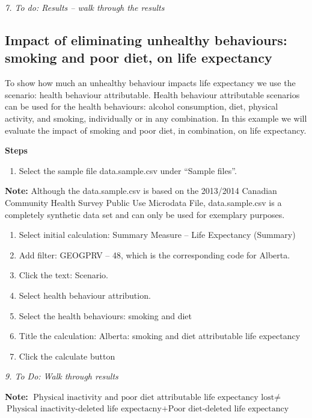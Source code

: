 \documentclass[]{book}
\providecommand{\tightlist}{%
  \setlength{\itemsep}{0pt}\setlength{\parskip}{0pt}}
\begin{document}
\emph{7. To do: Results -- walk through the results}

\subsection{Impact of eliminating unhealthy behaviours: smoking and poor
diet, on life
expectancy}\label{impact-of-eliminating-unhealthy-behaviours-smoking-and-poor-diet-on-life-expectancy}

To show how much an unhealthy behaviour impacts life expectancy we use
the scenario: health behaviour attributable. Health behaviour
attributable scenarios can be used for the health behaviours: alcohol
consumption, diet, physical activity, and smoking, individually or in
any combination. In this example we will evaluate the impact of smoking
and poor diet, in combination, on life expectancy.

\textbf{Steps}

\begin{enumerate}
\def\labelenumi{\arabic{enumi}.}
\tightlist
\item
  Select the sample file data.sample.csv under ``Sample files''.
\end{enumerate}

\textbf{Note:} Although the data.sample.csv is based on the 2013/2014
Canadian Community Health Survey Public Use Microdata File,
data.sample.csv is a completely synthetic data set and can only be used
for exemplary purposes.

\begin{enumerate}
\def\labelenumi{\arabic{enumi}.}
\setcounter{enumi}{1}
\item
  Select initial calculation: Summary Measure -- Life Expectancy
  (Summary)
\item
  Add filter: GEOGPRV -- 48, which is the corresponding code for
  Alberta.
\item
  Click the text: Scenario.
\item
  Select health behaviour attribution.
\item
  Select the health behaviours: smoking and diet
\item
  Title the calculation: Alberta: smoking and diet attributable life
  expectancy
\item
  Click the calculate button
\end{enumerate}

\emph{9. To Do: Walk through results}

\textbf{Note:}
\(\text{Physical inactivity and poor diet attributable life expectancy lost} \neq\)
\(\text{Physical inactivity-deleted life expectacny} + \text{Poor diet-deleted life expectancy}\)
\end{document}

